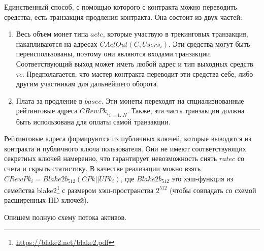 \documentclass[specification,annotation]{itmo-student-thesis}
\begin{document}
Единственный способ, с помощью которого с контракта можно переводить
средства, есть транзакция продления контракта. Она состоит из двух частей:

\begin{enumerate}
\item Весь объем монет типа $actc$, которые участвую в трекинговых
  транзакция, накапливаются на адресах $CActOut(C,Users_i)$. Эти
  средства могут быть переиспользованы, поэтому они являются входами
  транзакции. Соответствующий выход может иметь любой адрес и тип
  выходных средств $\tau c$. Предполагается, что мастер контракта
  переводит эти средства себе, либо другим участникам для дальнейшего
  оборота.
\item Плата за продление в $basec$. Эти монеты переходят на
  спциализиованные рейтинговые адреса ${CRewPk_i}_{i=1..N}$. Также, эта часть
  транзакции должна быть использована для оплаты самой транзакции.
\end{enumerate}

Рейтинговые адреса формируются из публичных ключей, которые выводятся
из контракта и публичного ключа пользователя. Они не имеют
соответствующих секретных ключей намеренно, что гарантирует
невозможность снять $ratec$ со счета и скрыть статистику. В качестве
реализации можно взять $CRewPk_i = Blake2b_{512}(CPk || UPk_i)$, где
$Blake2b_{512}$ это хэш-функция из семейства
blake2\footnote{\url{https://blake2.net/blake2.pdf}} с размером
хэш-пространства $2^{512}$ (чтобы совпадать со схемой расширенных HD
ключей).

Опишем полную схему потока активов.
\end{document}
